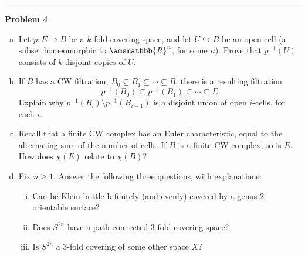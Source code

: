 \documentclass[a4paper, 12pt]{article}
\newenvironment{problem}[2][Problem]
    { \begin{mdframed}[backgroundcolor=gray!20] \textbf{#1 #2} \\}
    {  \end{mdframed}}
\renewcommand{\mathbb}{\amsmathbb}
\begin{document}
\noindent\rule{7in}{2.8pt}
\begin{problem}{4}
\begin{enumerate}[(a)]
\item Let \(p:E\rightarrow B\) be a \(k\)-fold covering space, and let \(U\hookrightarrow B\) be an open cell (a subset homeomorphic to \(\mathbb{R}^n\), for some \(n\)). Prove that \(p^{-1}(U)\) consists of \(k\) disjoint copies of \(U\). 
\item  If \(B\) has a CW filtration, \(B_0\subseteq B_1\subseteq \cdots \subseteq B\), there is a resulting filtration 
\[p^{-1}(B_0)\subseteq p^{-1}(B_1)\subseteq \cdots \subseteq E\]
Explain why \(p^{-1}(B_i)\setminus p^{-1}(B_{i-1})\) is a disjoint union of open \(i\)-cells, for each \(i\). 
\item Recall that a finite CW complex has an Euler characteristic, equal to the alternating sum of the number of cells. If \(B\) is a finite CW complex, so is \(E\). How does 
\(\chi(E)\) relate to \(\chi(B)\)? 
\item Fix \(n\geq 1\). Answer the following three questions, with explanations: 
\begin{enumerate}[i.]
\item Can be Klein bottle b finitely (and evenly) covered by a genus \(2\) orientable surface? 
\item Does \(S^{2n}\) have a path-connected \(3\)-fold covering space? 
\item Is \(S^{2n}\) a \(3\)-fold covering of some other space \(X\)?
\end{enumerate} 
\end{enumerate}
\end{problem}
\end{document}

